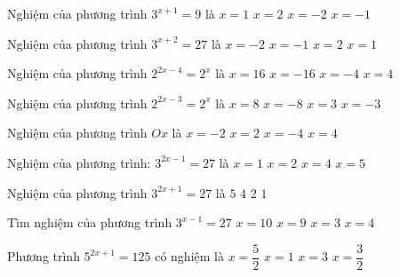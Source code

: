 \begin{ex}
	[Mã 103 - 2020 Lần 1]%
	Nghiệm của phương trình $3^{x+1}=9$ là
	\choice
	{\True $x=1$}
	{$x=2$}
	{$x=-2$}
	{$x=-1$}
\end{ex}
\begin{ex}
	[Mã 104 - 2020 Lần 1]%
	Nghiệm của phương trình $3^{x+2}=27$ là
	\choice
	{$x=-2$}
	{$x=-1$}
	{$x=2$}
	{\True $x=1$}
\end{ex}
\begin{ex}
	[Mã 102 - 2020 Lần 2]%
	Nghiệm của phương trình $2^{2x-4}=2^x$ là
	\choice
	{$x=16$}
	{$x=-16$}
	{$x=-4$}
	{\True $x=4$}
\end{ex}
\begin{ex}
	[Mã 101 - 2020 Lần 2]%
	Nghiệm của phương trình $2^{2x-3}=2^x$ là
	\choice
	{$x=8$}
	{$x=-8$}
	{\True $x=3$}
	{$x=-3$}
\end{ex}
\begin{ex}
	[Mã 104 - 2020 Lần 2]%
	Nghiệm của phương trình $Ox$ là
	\choice
	{$x=-2$}
	{\True $x=2$}
	{$x=-4$}
	{$x=4$}
\end{ex}
\begin{ex}
	[Mã 101 - 2019]%
	Nghiệm của phương trình: $3^{2x-1}=27$ là
	\choice
	{$x=1$}
	{\True $x=2$}
	{$x=4$}
	{$x=5$}
\end{ex}
\begin{ex}
	[Mã 102 - 2019]%
	Nghiệm của phương trình $3^{2x+1}=27$ là
	\choice
	{$5$}
	{$4$}
	{$2$}
	{\True $1$}
\end{ex}
\begin{ex}
	Tìm nghiệm của phương trình $3^{x-1}=27$ 
	\choice
	{$x=10$}
	{$x=9$}
	{$x=3$}
	{\True $x=4$}
\end{ex}
\begin{ex}
	[Mã 104 2018]%
	Phương trình $5^{2x+1}=125$ có nghiệm là
	\choice
	{$x=\dfrac{5}{2}$}
	{\True $x=1$}
	{$x=3$}
	{$x=\dfrac{3}{2}$}
\end{ex}  
